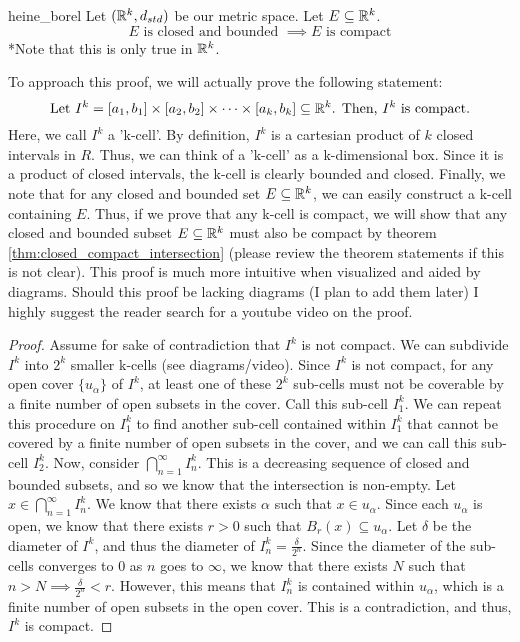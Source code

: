 \begin{thm}{}{heine_borel}
Let \(({\mathbb R}^k, d_{std})\) be our metric space. Let \(E \subseteq {\mathbb R}^k\). \newline 
\begin{equation*}
  \textrm{\(E\) is closed and bounded \(\implies E\) is compact}
\end{equation*}
*Note that this is only true in \({\mathbb R}^k\).\newline 

To approach this proof, we will actually prove the following statement: \newline 
\begin{equation*}
  \textrm{Let \(I^k = [a_1,b_1] \times [a_2,b_2] \times\cdots\times [a_k, b_k] \subseteq {\mathbb R}^k\). Then, \(I^k\) is compact.} 
\end{equation*}
Here, we call \(I^k\) a 'k-cell'. By definition, \(I^k\) is a cartesian product of \(k\) closed intervals in \(R\). Thus, we can think of a 'k-cell' as a k-dimensional box. Since it is a product of closed intervals, the k-cell is clearly bounded and closed. Finally, we note that for any closed and bounded set \(E \subseteq {\mathbb R}^k\), we can easily construct a k-cell containing \(E\). Thus, if we prove that any k-cell is compact, we will show that any closed and bounded subset \(E \subseteq {\mathbb R}^k\) must also be compact by theorem \ref{thm:closed_compact_intersection} (please review the theorem statements if this is not clear). This proof is much more intuitive when visualized and aided by diagrams. Should this proof be lacking diagrams (I plan to add them later) I highly suggest the reader search for a youtube video on the proof.
\begin{proof}
Assume for sake of contradiction that \(I^k\) is not compact. We can subdivide \(I^k\) into \(2^k\) smaller k-cells (see diagrams/video). Since \(I^k\) is not compact, for any open cover \(\{u_\alpha\}\) of \(I^k\), at least one of these \(2^k\) sub-cells must not be coverable by a finite number of open subsets in the cover. Call this sub-cell \(I^k_1\). We can repeat this procedure on \(I^k_1\) to find another sub-cell contained within \(I^k_1\) that cannot be covered by a finite number of open subsets in the cover, and we can call this sub-cell \(I^k_2\). Now, consider \(\bigcap_{n=1}^{\infty}I^k_n\). This is a decreasing sequence of closed and bounded subsets, and so we know that the intersection is non-empty. Let \(x \in \bigcap_{n=1}^{\infty}I^k_n\). We know that there exists \(\alpha\) such that \(x \in u_\alpha\). Since each \(u_\alpha\) is open, we know that there exists \(r > 0\) such that \(B_r(x) \subseteq u_\alpha\). Let \(\delta\) be the diameter of \(I^k\), and thus the diameter of \(I^k_n = \frac{\delta}{2^n}\). Since the diameter of the sub-cells converges to 0 as \(n\) goes to \(\infty\), we know that there exists \(N\) such that \(n > N \implies \frac{\delta}{2^n} < r\). However, this means that \(I^k_n\) is contained within \(u_\alpha\), which is a finite number of open subsets in the open cover. This is a contradiction, and thus, \(I^k\) is compact. 
\end{proof}


\end{thm}










